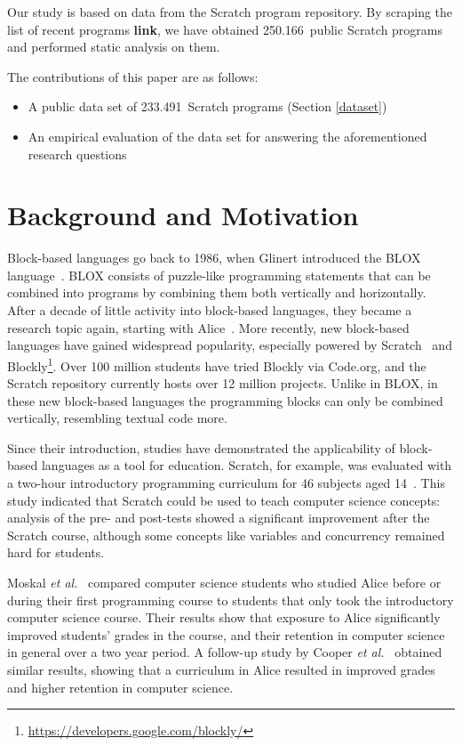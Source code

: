 \documentclass{sig-alternate}
\newcommand{\nPrograms}{250.166}
\newcommand{\nScriptPrograms}{233.491}
\newcommand{\todo}[1]{\textbf{#1}}
\begin{document}
Our study is based on data from the Scratch program repository. By scraping the list of recent programs \todo{link}, we have obtained \nPrograms~public Scratch programs and performed static analysis on them.

The contributions of this paper are as follows:

\begin{itemize}
	\item{A public data set of \nScriptPrograms~Scratch programs (Section \ref{dataset})}
	\item{An empirical evaluation of the data set for answering the aforementioned research questions}
\end{itemize}


\section{Background and Motivation}
\label{sec:background}
Block-based languages go back to 1986, when Glinert introduced the BLOX language~\cite{e._glinert_towards_1986}. BLOX consists of puzzle-like programming statements that can be combined into programs by combining them both vertically and horizontally. After a decade of little activity into block-based languages, they became a research topic again, starting with Alice~\cite{conway_alice:_1994}. More recently, new block-based languages have gained widespread popularity, especially powered by Scratch~\cite{resnick_scratch:_2009} and Blockly\footnote{\url{https://developers.google.com/blockly/}}. Over 100 million students have tried Blockly via Code.org, and the Scratch repository currently hosts over 12 million projects. Unlike in BLOX, in these new block-based languages the programming blocks can only be combined vertically, resembling textual code more.

Since their introduction, studies have demonstrated the applicability of block-based languages as a tool for education. Scratch, for example, was evaluated with a two-hour introductory programming curriculum for 46 subjects aged 14~\cite{meerbaum-salant_learning_2010}. This study indicated that Scratch could be used to teach computer science concepts: analysis of the pre- and post-tests showed a significant improvement after the Scratch course, although some concepts like variables and concurrency remained hard for students.

Moskal \emph{et al.}~\cite{b._moskal_evaluating_2005} compared computer science students who studied Alice before or during their first programming course to students that only took the introductory computer science course. Their results show that exposure to Alice significantly improved students' grades in the course, and their retention in computer science in general over a two year period. A follow-up study by Cooper \emph{et al.}~\cite{cooper_teaching_2003} obtained similar results, showing that a curriculum in Alice resulted in improved grades and higher retention in computer science.
\end{document}
